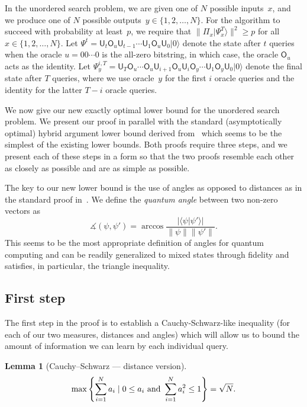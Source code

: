 \documentclass{article}
\newtheorem{lemma}[theorem]{Lemma}
\newcommand{\op}[1]{\mathsf{#1}}
\newcommand{\ket}[1]{\vert #1 \rangle}
\newcommand{\inner}[2]{\langle #1 \vert #2 \rangle}
\newcommand{\proj}{\mathsf{\Pi}}
\begin{document}
In the unordered search problem, we are given one of $N$ possible
inputs~$x$, and we produce one of $N$ possible outputs~$y \in \{1, 2,
\ldots, N\}$.  For the algorithm to succeed with probability at
least~$p$, we require that $\big\| \proj_x \ket{\Psi_x^T} \big\|^2
\geq p$ for all $x \in \{1, 2, \ldots, N\}$.  Let $\Psi^t = \op{U}_t
\op{O}_u \op{U}_{t-1} \cdots \op{U}_1 \op{O}_u \op{U}_0 \ket{0}$
denote the state after $t$ queries when the oracle $u = 00 \cdots 0$
is the all-zero bitstring, in which case, the oracle $\op{O}_u$ acts
as the identity.  Let $\Psi^{i,T}_y = \op{U}_T \op{O}_u \cdots
\op{O}_u \op{U}_{i+1} \op{O}_u \op{U}_i \op{O}_y \cdots \op{U}_1
\op{O}_y \op{U}_0 \ket{0}$ denote the final state after $T$ queries,
where we use oracle~$y$ for the first $i$ oracle queries and the
identity for the latter $T-i$ oracle queries.

We now give our new exactly optimal lower bound for the unordered
search problem.  We present our proof in parallel with the standard
(asymptotically optimal) hybrid argument lower bound derived
from~\cite{bbbv} which seems to be the simplest of the existing lower
bounds.  Both proofs require three steps, and we present each of these
steps in a form so that the two proofs resemble each other as closely
as possible and are as simple as possible.

The key to our new lower bound is the use of angles as opposed to
distances as in the standard proof in~\cite{bbbv}.  We define the
\emph{quantum angle} between two non-zero vectors as
\begin{equation}
  \measuredangle (\psi, \psi') = \arccos 
  \frac{\big\vert \inner{\psi}{\psi'}\big\vert}{\| \psi \| \| \psi' \|}.
\end{equation}
This seems to be the most appropriate definition of angles for quantum
computing and can be readily generalized to mixed states through
fidelity and satisfies, in particular, the triangle inequality.

\subsection{First step}
The first step in the proof is to establish a Cauchy-Schwarz-like
inequality (for each of our two measures, distances and angles) which
will allow us to bound the amount of information we can learn by each
individual query.

\begin{lemma}[Cauchy--Schwarz --- distance version]\label{lm:cs}
\begin{equation}
\max\left\{ \sum\limits_{i=1}^{N} a_{i} \mid 0 \leq a_{i}
  \textup{ and }
  \sum\limits_{i=1}^{N} a_{i}^{2} \leq 1 \right\} = \sqrt{N}.
\end{equation}
\end{lemma}
\end{document}
